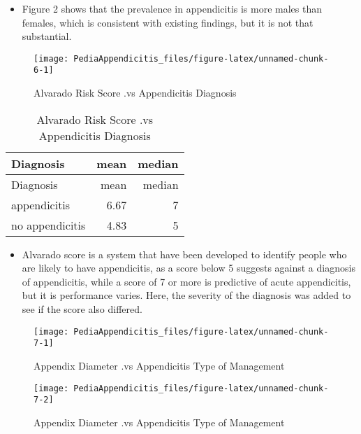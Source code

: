 \documentclass[
]{article}
\providecommand{\tightlist}{%
  \setlength{\itemsep}{0pt}\setlength{\parskip}{0pt}}
\begin{document}
\begin{itemize}
\tightlist
\item
  Figure 2 shows that the prevalence in appendicitis is more males than
  females, which is consistent with existing findings, but it is not
  that substantial.
\end{itemize}

\begin{figure}

{\centering \texttt{[image: PediaAppendicitis\_files/figure-latex/unnamed-chunk-6-1]} 

}

\caption{Alvarado Risk Score .vs Appendicitis Diagnosis}\label{fig:unnamed-chunk-6}
\end{figure}

\begin{longtable}[]{@{}lrr@{}}
\caption{Alvarado Risk Score .vs Appendicitis Diagnosis}\tabularnewline
\toprule\noalign{}
Diagnosis & mean & median \\
\midrule\noalign{}
\endfirsthead
\toprule\noalign{}
Diagnosis & mean & median \\
\midrule\noalign{}
\endhead
\bottomrule\noalign{}
\endlastfoot
appendicitis & 6.67 & 7 \\
no appendicitis & 4.83 & 5 \\
\end{longtable}

\begin{itemize}
\tightlist
\item
  Alvarado score is a system that have been developed to identify people
  who are likely to have appendicitis, as a score below 5 suggests
  against a diagnosis of appendicitis, while a score of 7 or more is
  predictive of acute appendicitis, but it is performance varies. Here,
  the severity of the diagnosis was added to see if the score also
  differed.
\end{itemize}

\begin{figure}

{\centering \texttt{[image: PediaAppendicitis\_files/figure-latex/unnamed-chunk-7-1]} 

}

\caption{Appendix Diameter .vs Appendicitis Type of Management}\label{fig:unnamed-chunk-7-1}
\end{figure}
\begin{figure}

{\centering \texttt{[image: PediaAppendicitis\_files/figure-latex/unnamed-chunk-7-2]} 

}

\caption{Appendix Diameter .vs Appendicitis Type of Management}\label{fig:unnamed-chunk-7-2}
\end{figure}
\end{document}

